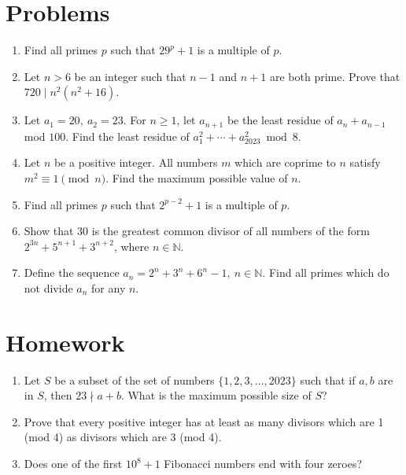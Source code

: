 \documentclass{article}
\begin{document}
\section{Problems}
\begin{enumerate}
  \item Find all primes $p$ such that $29^p+1$ is a multiple of $p$.
  \item Let $n>6$ be an integer such that $n-1$ and $n+1$ are both prime. Prove
    that $720\mid n^2(n^2+16)$.
  \item Let $a_1=20,\ a_2=23$. For $n\ge 1$, let $a_{n+1}$ be the least residue
    of $a_n+a_{n-1}$ mod $100$. Find the least residue of
    $a_1^2+\cdots+a_{2023}^2\bmod 8$.
  \item Let $n$ be a positive integer. All numbers $m$ which are coprime to $n$
    satisfy $m^2\equiv 1\pmod n$. Find the maximum possible value of $n$.
  \item Find all primes $p$ such that $2^{p-2}+1$ is a multiple of $p$.
  \item Show that $30$ is the greatest common divisor of all numbers of the form
    $2^{3n}+5^{n+1}+3^{n+2}$, where $n \in \mathbb{N}$.
  \item Define the sequence $a_n=2^n+3^n+6^n-1,\ n\in\mathbb N$.
    Find all primes which do not divide $a_n$ for any $n$.
\end{enumerate}
\newpage
\section{Homework}
\begin{enumerate}
  \item Let $S$ be a subset of the set of numbers $\{1, 2, 3,\ldots, 2023\}$
    such that if $a,b$ are in $S$, then $23\nmid a+b$. What is the maximum
    possible size of $S$?
  \item Prove that every positive integer has at least as many divisors which
    are 1 (mod 4) as divisors which are 3 (mod 4).
  \item Does one of the first $10^8+1$ Fibonacci numbers end with four zeroes?
\end{enumerate}
\end{document}
